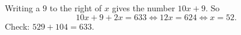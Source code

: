 Writing a $9$ to the right of $x$ gives the number $10x+9$. So
\[
10x+9+2x=633\iff 12x=624\iff x=\boxed{52}.
\]
Check: $529+104=633$.
